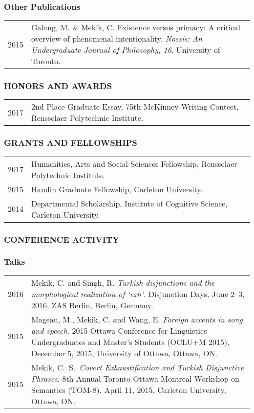 \documentclass[12pt, letterpaper]{article}
\begin{document}
\subsubsection*{Other Publications}
\begin{longtable}{p{}p{}}
2015&\noindent\hangindent=1cm Galang, M. \& Mekik, C. Existence versus primacy: A critical overview of phenomenal intentionality. \emph{Noesis: An Undergraduate Journal of Philosophy, 16}. University of Toronto.
\end{longtable}

\subsubsection*{HONORS AND AWARDS}
\begin{longtable}{p{}p{}}
2017 & 2nd Place Graduate Essay, 75th McKinney Writing Contest, Rensselaer Polytechnic Institute. \\
\end{longtable}

\subsubsection*{GRANTS AND FELLOWSHIPS}
\begin{longtable}{p{}p{}}
2017 & Humanities, Arts and Social Sciences Fellowship, Rensselaer Polytechnic Institute. \\
2015 & Hamlin Graduate Fellowship, Carleton University. \\
2014 & Departmental Scholarship, Institute of Cognitive Science, Carleton University.
\end{longtable}

\subsubsection*{CONFERENCE ACTIVITY}

\subsubsection*{Talks}

\begin{longtable}{p{}p{}}
2016 & \noindent\hangindent=1cm Mekik, C. and Singh, R. \emph{Turkish disjunctions and the morphological realization of `exh'}. Disjunction Days, June 2--3, 2016, ZAS Berlin, Berlin, Germany.\\

2015 & \noindent\hangindent=1cm Mageau, M., Mekik, C. and Wang, E. \emph{Foreign accents in song and speech}. 2015 Ottawa Conference for Linguistics Undergraduates and Master's Students (OCLU+M 2015), December 5, 2015, University of Ottawa, Ottawa, ON. \\

2015 & \noindent\hangindent=1cm Mekik, C.\ S.\ \emph{Covert Exhaustification and Turkish Disjunctive Phrases}. 8th Annual Toronto-Ottawa-Montreal Workshop on Semantics (TOM-8), April 11, 2015, Carleton University, Ottawa, ON.
\end{longtable}
\end{document}
